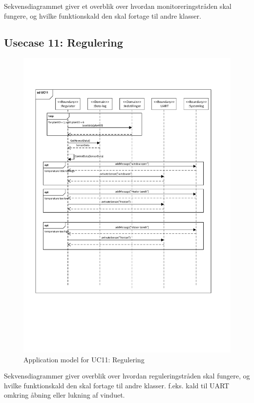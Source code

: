Sekvensdiagrammet giver et overblik over hvordan monitoreringstråden skal fungere, og hvilke funktionskald den skal fortage til andre klasser.

\clearpage

\subsection{Usecase 11: Regulering}

\begin{figure}[!h]
\centering 
\includegraphics[width={\textwidth}, trim=0 150 0 90, clip=true]{../fig/SD_autogreen_UC_11_regulering.pdf}
\caption{Application model for UC11: Regulering}
\label{fig:SD_UC11}
\end{figure}

Sekvensdiagrammer giver overblik over hvordan reguleringstråden skal fungere, og hvilke funktionskald den skal fortage til andre klasser. f.eks. kald til UART omkring åbning eller lukning af vinduet.

\clearpage